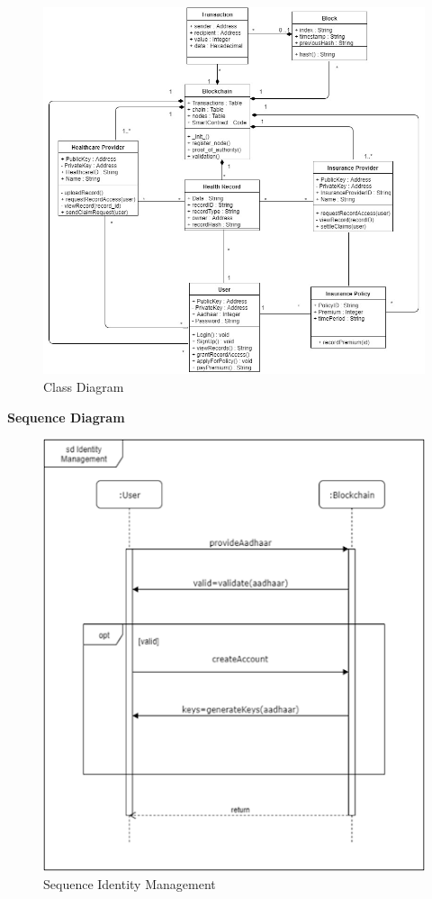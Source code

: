 \begin{figure}[!h]
	\centering
	\includegraphics[width=\linewidth]{Images/UML/ClassDiagram.jpg}
	\caption{ Class Diagram}
\end{figure}
\clearpage
\textbf{Sequence Diagram}
\begin{figure}[!t]
	\centering
	\includegraphics[width=0.6\linewidth]{Images/UML/SequenceIdentityManagement.png}
	\caption{ Sequence Identity Management}
\end{figure}
